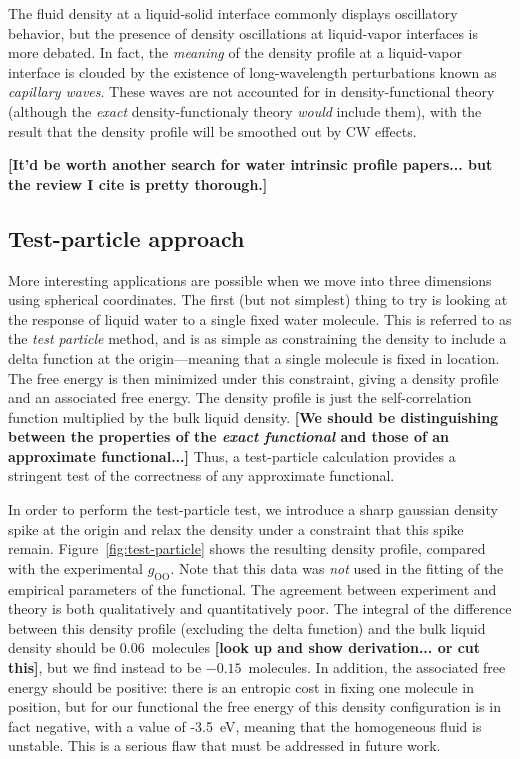 \documentclass[letterpaper,twocolumn,amsmath,amssymb,prb]{revtex4}
\newcommand{\red}[1]{{\bf \color{red} #1}}
\newcommand{\fixme}[1]{\red{[#1]}}
\begin{document}
The fluid density at a liquid-solid interface commonly displays
oscillatory behavior, but the presence of density oscillations at
liquid-vapor interfaces is more debated\cite{penfold2001structure}.
In fact, the \emph{meaning} of the density profile at a liquid-vapor
interface is clouded by the existence of long-wavelength perturbations
known as \emph{capillary waves}.  These waves are not accounted for in
density-functional theory (although the \emph{exact}
density-functionaly theory \emph{would} include them), with the result
that the density profile will be smoothed out by CW effects.

\fixme{It'd be worth another search for water intrinsic profile
  papers... but the review I cite is pretty thorough.}

\subsection{Test-particle approach}

More interesting applications are possible when we move into three
dimensions using spherical coordinates.  The first (but not simplest)
thing to try is looking at the response of liquid water to a single
fixed water molecule.  This is referred to as the \emph{test particle}
method\cite{FIXME}, and is as simple as constraining the density to
include a delta function at the origin---meaning that a single
molecule is fixed in location.  The free energy is then minimized
under this constraint, giving a density profile and an associated free
energy.  The density profile is just the self-correlation function
multiplied by the bulk liquid density.  \fixme{We should be
  distinguishing between the properties of the \emph{exact functional}
  and those of an approximate functional...}  Thus, a test-particle
calculation provides a stringent test of the correctness of any
approximate functional.

In order to perform the test-particle test, we introduce a sharp
gaussian density spike at the origin and relax the density under a
constraint that this spike remain.  Figure~\ref{fig:test-particle}
shows the resulting density profile, compared with the experimental
$g_{\textrm{OO}}$.  Note that this data was \emph{not} used in the
fitting of the empirical parameters of the functional.  The agreement
between experiment and theory is both qualitatively and quantitatively
poor.  The integral of the difference between this density profile
(excluding the delta function) and the bulk liquid density should be
0.06~molecules \fixme{look up and show derivation... or cut this},
but we find instead to be $-0.15$~molecules.  In addition, the associated
free energy should be positive: there is an entropic cost in fixing
one molecule in position, but for our functional the free energy of
this density configuration is in fact negative, with a value of
-3.5~eV, meaning that the homogeneous fluid is unstable.  This is a
serious flaw that must be addressed in future work.
\end{document}
